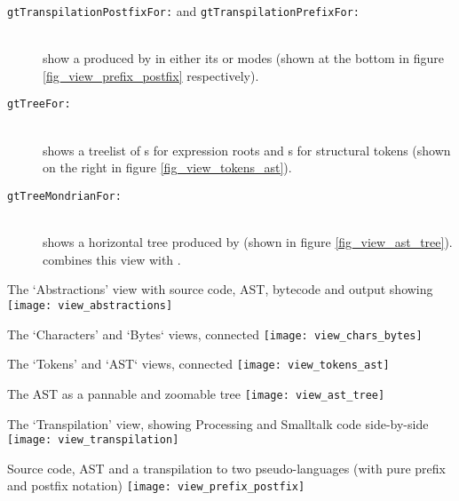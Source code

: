 \begin{description}
\item[\texttt{gtTranspilationPostfixFor:} and \texttt{gtTranspilationPrefixFor:}] \hfill \\
	show a  produced by  in either its  or  modes (shown at the bottom in figure \ref{fig_view_prefix_postfix} respectively).
\item[\texttt{gtTreeFor:}] \hfill \\
	shows a treelist of s for expression roots and s for structural tokens (shown on the right in figure \ref{fig_view_tokens_ast}).
\item[\texttt{gtTreeMondrianFor:}] \hfill \\
	shows a horizontal  tree produced by  (shown in figure \ref{fig_view_ast_tree}).  combines this view with .
\end{description}

\begin{cfigure}{The `Abstractions' view with source code, \ac{AST}, bytecode and output showing}
\texttt{[image: view\_abstractions]}
\end{cfigure}

\begin{cfigure}{The `Characters' and `Bytes` views, connected}
\texttt{[image: view\_chars\_bytes]}
\end{cfigure}

\begin{cfigure}{The `Tokens' and `\ac{AST}` views, connected}
\texttt{[image: view\_tokens\_ast]}
\end{cfigure}

\begin{cfigure}{The \ac{AST} as a pannable and zoomable tree}
\texttt{[image: view\_ast\_tree]}
\end{cfigure}

\begin{cfigure}{The `Transpilation' view, showing Processing and Smalltalk code side-by-side}
\texttt{[image: view\_transpilation]}
\end{cfigure}

\begin{cfigure}{Source code, \ac{AST} and a transpilation to two pseudo-languages (with pure prefix and postfix notation)}
\texttt{[image: view\_prefix\_postfix]}
\end{cfigure}

